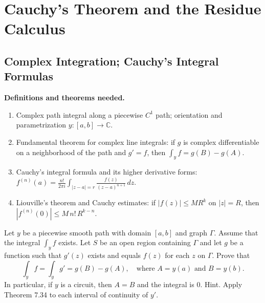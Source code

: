 
\chapter{Cauchy's Theorem and the Residue Calculus}
\section{Complex Integration; Cauchy's Integral Formulas}

\noindent\textbf{Definitions and theorems needed.}
\begin{enumerate}[label=(\alph*)]
\item Complex path integral along a piecewise $C^1$ path; orientation and parametrization $y:[a,b]\to\mathbb C$.
\item Fundamental theorem for complex line integrals: if $g$ is complex differentiable on a neighborhood of the path and $g'=f$, then $\int_y f= g(B)-g(A)$.
\item Cauchy's integral formula and its higher derivative forms: $f^{(n)}(a)=\frac{n!}{2\pi i}\int_{|z-a|=r} \frac{f(z)}{(z-a)^{n+1}}\,dz$.
\item Liouville's theorem and Cauchy estimates: if $|f(z)|\le M R^k$ on $|z|=R$, then $|f^{(n)}(0)|\le M\, n!\, R^{k-n}$.
\end{enumerate}

\begin{problembox}
Let \( y \) be a piecewise smooth path with domain \([a, b]\) and graph \(\Gamma\). Assume that the integral \( \int_y f \) exists. Let \( S \) be an open region containing \(\Gamma\) and let \( g \) be a function such that \( g'(z) \) exists and equals \( f(z) \) for each \( z \) on \(\Gamma\). Prove that
\[\int_y f = \int_y g' = g(B) - g(A), \quad \text{where } A = y(a) \text{ and } B = y(b).\]
In particular, if \( y \) is a circuit, then \( A = B \) and the integral is 0. Hint. Apply Theorem 7.34 to each interval of continuity of \( y' \).
\end{problembox}

